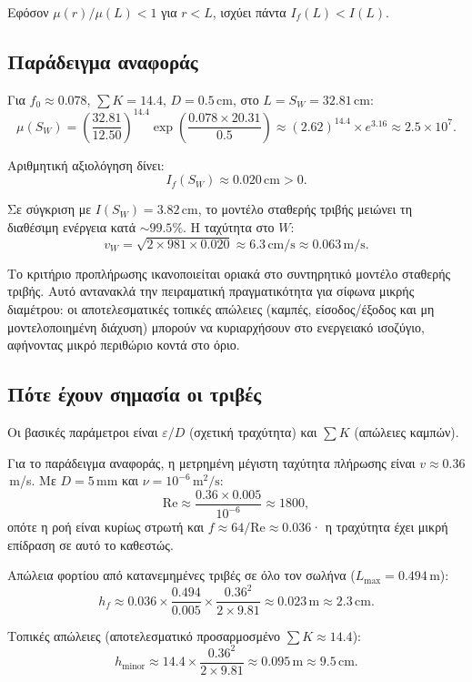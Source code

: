 \documentclass[11pt]{article}
\begin{document}
Εφόσον $\mu(r)/\mu(L) < 1$ για $r < L$, ισχύει πάντα $I_f(L) < I(L)$.

\subsection{Παράδειγμα αναφοράς}

Για $f_0 \approx 0.078$, $\sum K = 14.4$, $D = 0.5$\,cm, στο $L = S_W = 32.81$\,cm:
\[
  \mu(S_W) = \left(\frac{32.81}{12.50}\right)^{14.4} \exp\left(\frac{0.078 \times 20.31}{0.5}\right) \approx (2.62)^{14.4} \times e^{3.16} \approx 2.5\times 10^{7}.
\]

Αριθμητική αξιολόγηση δίνει:
\begin{equation}
  I_f(S_W) \approx 0.020\,\text{cm} > 0.
  \label{eq:I-f-value}
\end{equation}

Σε σύγκριση με $I(S_W) = 3.82$\,cm, το μοντέλο σταθερής τριβής μειώνει τη διαθέσιμη ενέργεια κατά $\sim 99.5\%$. Η ταχύτητα στο $W$:
\[
  v_W = \sqrt{2 \times 981 \times 0.020} \approx 6.3\,\text{cm/s} \approx 0.063\,\text{m/s}.
\]

Το κριτήριο προπλήρωσης ικανοποιείται οριακά στο συντηρητικό μοντέλο σταθερής τριβής. Αυτό αντανακλά την πειραματική πραγματικότητα για σίφωνα μικρής διαμέτρου: οι αποτελεσματικές τοπικές απώλειες (καμπές, είσοδος/έξοδος και μη μοντελοποιημένη διάχυση) μπορούν να κυριαρχήσουν στο ενεργειακό ισοζύγιο, αφήνοντας μικρό περιθώριο κοντά στο όριο.

\subsection{Πότε έχουν σημασία οι τριβές}

Οι βασικές παράμετροι είναι $\varepsilon/D$ (σχετική τραχύτητα) και $\sum K$ (απώλειες καμπών).

Για το παράδειγμα αναφοράς, η μετρημένη μέγιστη ταχύτητα πλήρωσης είναι $v \approx 0.36$\,m/s. Με $D = 5$\,mm και $\nu = 10^{-6}\,\text{m}^2/\text{s}$:
\[
  \text{Re} \approx \frac{0.36 \times 0.005}{10^{-6}} \approx 1800,
\]
οπότε η ροή είναι κυρίως στρωτή και $f \approx 64/\text{Re} \approx 0.036$· η τραχύτητα έχει μικρή επίδραση σε αυτό το καθεστώς.

Απώλεια φορτίου από κατανεμημένες τριβές σε όλο τον σωλήνα ($L_{\max} = 0.494$\,m):
\[
  h_f \approx 0.036 \times \frac{0.494}{0.005} \times \frac{0.36^2}{2 \times 9.81} \approx 0.023\,\text{m} \approx 2.3\,\text{cm}.
\]

Τοπικές απώλειες (αποτελεσματικό προσαρμοσμένο $\sum K \approx 14.4$):
\[
  h_{\text{minor}} \approx 14.4 \times \frac{0.36^2}{2 \times 9.81} \approx 0.095\,\text{m} \approx 9.5\,\text{cm}.
\]
\end{document}
